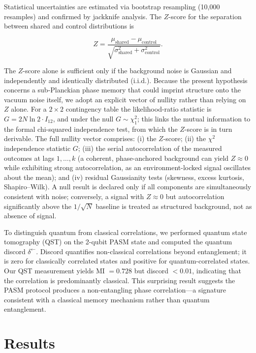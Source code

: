 \documentclass[12pt,a4paper]{article}
\begin{document}
Statistical uncertainties are estimated via bootstrap resampling (10,000 resamples) and confirmed by jackknife analysis. The $Z$-score for the separation between shared and control distributions is

\begin{equation}
Z = \frac{\mu_{\text{shared}} - \mu_{\text{control}}}{\sqrt{\sigma^2_{\text{shared}} + \sigma^2_{\text{control}}}}.
\end{equation}

The $Z$-score alone is sufficient only if the background noise is Gaussian and independently and identically distributed (i.i.d.). Because the present hypothesis concerns a sub-Planckian phase memory that could imprint structure onto the vacuum noise itself, we adopt an explicit vector of nullity rather than relying on $Z$ alone. For a $2\times2$ contingency table the likelihood-ratio statistic is $G = 2N\ln 2 \cdot I_{12}$, and under the null $G \sim \chi^2_1$; this links the mutual information to the formal chi-squared independence test, from which the $Z$-score is in turn derivable. The full nullity vector comprises: (i) the $Z$-score; (ii) the $\chi^2$ independence statistic $G$; (iii) the serial autocorrelation of the measured outcomes at lags $1,\ldots,k$ (a coherent, phase-anchored background can yield $Z \approx 0$ while exhibiting strong autocorrelation, as an environment-locked signal oscillates about the mean); and (iv) residual Gaussianity tests (skewness, excess kurtosis, Shapiro--Wilk). A null result is declared only if all components are simultaneously consistent with noise; conversely, a signal with $Z \approx 0$ but autocorrelation significantly above the $1/\sqrt{N}$ baseline is treated as structured background, not as absence of signal.

To distinguish quantum from classical correlations, we performed quantum state tomography (QST) on the 2-qubit PASM state and computed the quantum discord $\delta^\leftarrow$. Discord quantifies non-classical correlations beyond entanglement; it is zero for classically correlated states and positive for quantum-correlated states. Our QST measurement yields MI $= 0.728$ but discord $< 0.01$, indicating that the correlation is predominantly classical. This surprising result suggests the PASM protocol produces a non-entangling phase correlation---a signature consistent with a classical memory mechanism rather than quantum entanglement.

\section{Results}
\label{sec:results}
\end{document}
